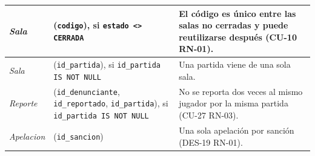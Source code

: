 \begin{center}
\begin{longtable}{|L{0.2\textwidth}|L{0.25\textwidth}|L{0.45\textwidth}|}
\textit{Sala} & (\texttt{codigo}), si \texttt{estado <> CERRADA} & El código es único entre las salas no cerradas y puede reutilizarse después (\mbox{CU-10} \mbox{RN-01}). \\ \hline
\textit{Sala} & (\texttt{id\_\allowbreak{}partida}), si \texttt{id\_\allowbreak{}partida IS NOT NULL} & Una partida viene de una sola sala. \\ \hline
\textit{Reporte} & (\texttt{id\_\allowbreak{}denunciante}, \texttt{id\_\allowbreak{}reportado}, \texttt{id\_\allowbreak{}partida}), si \texttt{id\_\allowbreak{}partida IS NOT NULL} & No se reporta dos veces al mismo jugador por la misma partida (\mbox{CU-27} \mbox{RN-03}). \\ \hline
\textit{Apelacion} & (\texttt{id\_\allowbreak{}sancion}) & Una sola apelación por sanción (\mbox{DES-19} \mbox{RN-01}). \\ \hline
\end{longtable}
\end{center}

